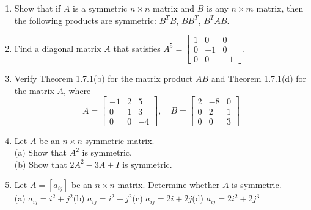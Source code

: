 \documentclass{article}
\theoremstyle{mystyle}
\begin{document}
\begin{enumerate}
    \item[30.] Show that if $A$ is a symmetric $n\times n$ matrix and $B$ is any $n\times m$ matrix, then the following products are symmetric: $B^TB$, $BB^T$, $B^TAB$.

    \item[31.] Find a diagonal matrix $A$ that satisfies $A^5=\begin{bmatrix}1&0&0\\0&-1&0\\0&0&-1\end{bmatrix}$.

    \item[33.] Verify Theorem 1.7.1(b) for the matrix product $AB$ and Theorem 1.7.1(d) for the matrix $A$, where
    \[
    A=\begin{bmatrix}-1&2&5\\0&1&3\\0&0&-4\end{bmatrix},\quad
    B=\begin{bmatrix}2&-8&0\\0&2&1\\0&0&3\end{bmatrix}
    \]

    \item[34.] Let $A$ be an $n\times n$ symmetric matrix.\\
    (a) Show that $A^2$ is symmetric.\\
    (b) Show that $2A^2-3A+I$ is symmetric.

    \item[37.] Let $A=[a_{ij}]$ be an $n\times n$ matrix. Determine whether $A$ is symmetric.\\
    (a) $a_{ij}=i^2+j^2$\quad (b) $a_{ij}=i^2-j^2$\quad (c) $a_{ij}=2i+2j$\quad (d) $a_{ij}=2i^2+2j^3$
\end{enumerate}
\end{document}
